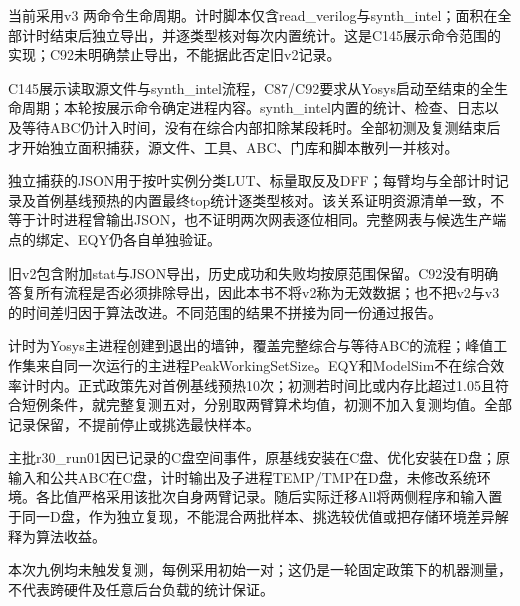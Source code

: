 \documentclass[UTF8,fontset=fandol,12pt]{ctexart}
\begin{document}
当前采用v3 两命令生命周期。计时脚本仅含read\_\allowbreak{}verilog与synth\_\allowbreak{}intel；面积在全部计时结束后独立导出，并逐类型核对每次内置统计。这是C145展示命令范围的实现；C92未明确禁止导出，不能据此否定旧v2记录。

C145展示读取源文件与synth\_\allowbreak{}intel流程，C87/\allowbreak{}C92要求从Yosys启动至结束的全生命周期；本轮按展示命令确定进程内容。synth\_\allowbreak{}intel内置的统计、检查、日志以及等待ABC仍计入时间，没有在综合内部扣除某段耗时。全部初测及复测结束后才开始独立面积捕获，源文件、工具、ABC、门库和脚本散列一并核对。

独立捕获的JSON用于按叶实例分类LUT、标量取反及DFF；每臂均与全部计时记录及首例基线预热的内置最终top统计逐类型核对。该关系证明资源清单一致，不等于计时进程曾输出JSON，也不证明两次网表逐位相同。完整网表与候选生产端点的绑定、EQY仍各自单独验证。

旧v2包含附加stat与JSON导出，历史成功和失败均按原范围保留。C92没有明确答复所有流程是否必须排除导出，因此本书不将v2称为无效数据；也不把v2与v3的时间差归因于算法改进。不同范围的结果不拼接为同一份通过报告。

计时为Yosys主进程创建到退出的墙钟，覆盖完整综合与等待ABC的流程；峰值工作集来自同一次运行的主进程PeakWorkingSetSize。EQY和ModelSim不在综合效率计时内。正式政策先对首例基线预热10次；初测若时间比或内存比超过1.05且符合短例条件，就完整复测五对，分别取两臂算术均值，初测不加入复测均值。全部记录保留，不提前停止或挑选最快样本。

主批r30\_\allowbreak{}run01因已记录的C盘空间事件，原基线安装在C盘、优化安装在D盘；原输入和公共ABC在C盘，计时输出及子进程TEMP/\allowbreak{}TMP在D盘，未修改系统环境。各比值严格采用该批次自身两臂记录。随后实际迁移All将两侧程序和输入置于同一D盘，作为独立复现，不能混合两批样本、挑选较优值或把存储环境差异解释为算法收益。

本次九例均未触发复测，每例采用初始一对；这仍是一轮固定政策下的机器测量，不代表跨硬件及任意后台负载的统计保证。
\end{document}
